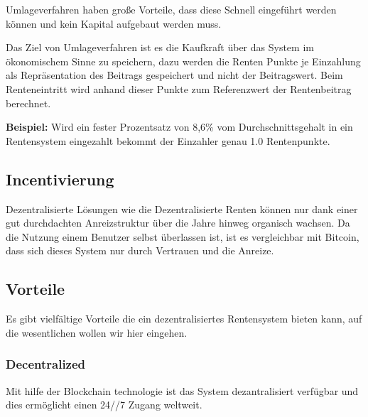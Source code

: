 
Umlageverfahren haben große Vorteile, dass diese Schnell eingeführt werden können und kein Kapital aufgebaut werden muss.

Das Ziel von Umlageverfahren ist es die Kaufkraft über das System im ökonomischem Sinne zu speichern, dazu werden die Renten Punkte je Einzahlung als Repräsentation des Beitrags gespeichert und nicht der Beitragswert.
Beim Renteneintritt wird anhand dieser Punkte zum Referenzwert der Rentenbeitrag berechnet. 

\textbf{Beispiel:} Wird ein fester Prozentsatz von 8,6\% vom Durchschnittsgehalt in ein Rentensystem eingezahlt bekommt der Einzahler genau 1.0 Rentenpunkte.


\subsection{Incentivierung}


Dezentralisierte Lösungen wie die Dezentralisierte Renten können nur dank einer gut durchdachten Anreizstruktur über die Jahre hinweg organisch wachsen. Da die Nutzung einem Benutzer selbst überlassen ist, ist es vergleichbar mit Bitcoin\cite{bitcoin}, dass sich dieses System nur durch Vertrauen und die Anreize.





\subsection{Vorteile}

Es gibt vielfältige Vorteile die ein dezentralisiertes Rentensystem bieten kann, auf die wesentlichen wollen wir hier eingehen.

\subsubsection*{Decentralized}
Mit hilfe der Blockchain technologie ist das System dezantralisiert verfügbar und dies ermöglicht einen 24//7 Zugang weltweit.
